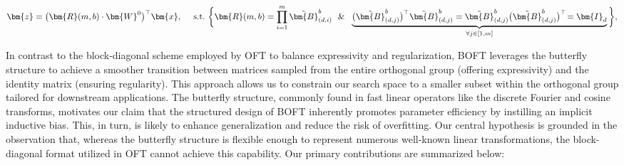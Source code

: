\begin{equation}
    \begin{aligned}\nonumber
    \bm{z}=\big(\bm{R}(m,b)\cdot\bm{W}^0\big)^\top\bm{x},~~~~\text{s.t.}~\bigg{\{}\bm{R}(m,b)=\prod_{i=1}^m \tilde{\bm{B}}^b_{(d,i)}~~\&~~\underbrace{\big(\tilde{\bm{B}}^b_{(d,j)}\big)^\top\tilde{\bm{B}}^b_{(d,j)}=\tilde{\bm{B}}^b_{(d,j)}\big(\tilde{\bm{B}}^b_{(d,j)}\big)^\top\!=\bm{I}_d}_{\forall j\in [1, m]}\bigg{\}},
    \end{aligned}
\end{equation}

In contrast to the block-diagonal scheme employed by OFT to balance expressivity and regularization, BOFT leverages the butterfly structure to achieve a smoother transition between matrices sampled from the entire orthogonal group (offering expressivity) and the identity matrix (ensuring regularity). This approach allows us to constrain our search space to a smaller subset within the orthogonal group tailored for downstream applications. The butterfly structure, commonly found in fast linear operators like the discrete Fourier and cosine transforms, motivates our claim that the structured design of BOFT inherently promotes parameter efficiency by instilling an implicit inductive bias. This, in turn, is likely to enhance generalization and reduce the risk of overfitting. Our central hypothesis is grounded in the observation that, whereas the butterfly structure is flexible enough to represent numerous well-known linear transformations, the block-diagonal format utilized in OFT cannot achieve this capability. Our primary contributions are summarized below:

